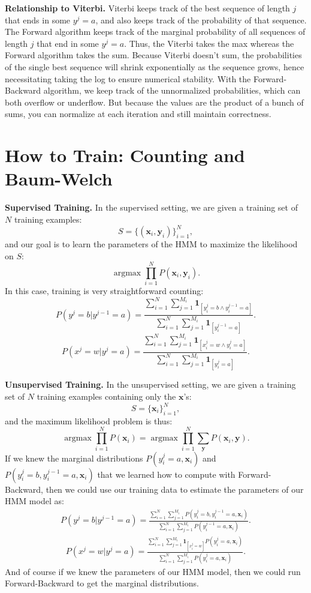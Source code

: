 \documentclass{article}
\DeclareMathOperator{\argmax}{argmax}
\newcommand{\x}{\textbf{x}}
\newcommand{\y}{\textbf{y}}
\begin{document}
\textbf{Relationship to Viterbi.}    Viterbi keeps track of the best sequence of length $j$ that ends in some $y^j=a$, and also keeps track of the probability of that sequence.  The Forward algorithm keeps track of the marginal probability of all sequences of length $j$ that end in some $y^j=a$.  Thus, the Viterbi takes the max whereas the Forward algorithm takes the sum.  Because Viterbi doesn't sum, the probabilities of the single best sequence will shrink exponentially as the sequence grows, hence necessitating taking the log to ensure numerical stability. With the Forward-Backward algorithm, we keep track of the unnormalized probabilities, which can both overflow or underflow.  But because the values are the product of a bunch of sums, you can normalize at each iteration and still maintain correctness.

\section{How to Train: Counting and Baum-Welch}

\textbf{Supervised Training.}
In the supervised setting, we are given a training set of $N$ training examples:  
$$S = \{(\x_i,\y_i)\}_{i=1}^N,$$
and our goal is to learn the parameters of the HMM to maximize the likelihood on $S$:
$$\argmax \prod_{i=1}^N P(\x_i,\y_i).$$
In this case, training is very straightforward counting:
$$P(y^j=b|y^{j-1}=a) = \frac{\sum_{i=1}^N\sum_{j=1}^{M_i} \textbf{1}_{[y_i^j=b \wedge y_i^{j-1} = a]}}{\sum_{i=1}^N\sum_{j=1}^{M_i} \textbf{1}_{[y_i^{j-1} = a]}}.$$
$$P(x^j=w|y^{j}=a) = \frac{\sum_{i=1}^N\sum_{j=1}^{M_i} \textbf{1}_{[x_i^j=w \wedge y_i^{j} = a]}}{\sum_{i=1}^N\sum_{j=1}^{M_i} \textbf{1}_{[y_i^{j} = a]}}.$$

\textbf{Unsupervised Training.}
In the unsupervised setting, we are given a training set of $N$ training examples  containing only the $\x$'s:
$$S = \{\x_i\}_{i=1}^N,$$
and the maximum likelihood problem is thus:
$$\argmax \prod_{i=1}^N P(\x_i)=\argmax \prod_{i=1}^N \sum_\y P(\x_i,\y).$$
If we knew the marginal distributions $P( y_i^{j} = a,\x_i)$ and $P(y_i^j=b ,y_i^{j-1} = a, \x_i)$ that we learned how to compute with Forward-Backward, then we could use our training data to estimate the parameters of our HMM model as:
\begin{eqnarray}P(y^j=b|y^{j-1}=a) = \frac{\sum_{i=1}^N\sum_{j=1}^{M_i} P(y_i^j=b ,y_i^{j-1} = a, \x_i)}{\sum_{i=1}^N\sum_{j=1}^{M_i} P(y_i^{j-1}=a,\x_i)}.\label{eqn:M_step}\end{eqnarray}
\begin{eqnarray}P(x^j=w|y^{j}=a) = \frac{\sum_{i=1}^N\sum_{j=1}^{M_i} \textbf{1}_{[x_i^j=w]} P( y_i^{j} = a,\x_i)}{\sum_{i=1}^N\sum_{j=1}^{M_i} P(y_i^{j} = a,\x_i)}.\label{eqn:M_step2}\end{eqnarray}
And of course if we knew the parameters of our HMM model, then we could run Forward-Backward to get the marginal distributions.
\end{document}
